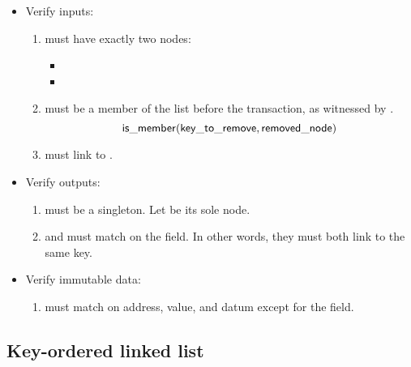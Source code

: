 \documentclass[../midgard.tex]{subfiles}
\begin{document}
\begin{description}
\begin{itemize}
            \item Verify inputs:
            \begin{enumerate}[resume]
                \item {} must have exactly two nodes:
                    \begin{itemize}
                        \item {}
                        \item {}
                    \end{itemize}
                \item {} must be a member of the list before the transaction, as witnessed by .
                    \begin{equation*}
                        \mathsf{is\_member} (\mathsf{key\_to\_remove}, \mathsf{removed\_node})
                    \end{equation*}
                \item {} must link to .
            \end{enumerate}

            \item Verify outputs:
            \begin{enumerate}[resume]
                \item {} must be a singleton. Let  be its sole node.
                \item {} and  must match on the  field. In other words, they must both link to the same key.
            \end{enumerate}
            
            \item Verify immutable data:
            \begin{enumerate}[resume]
                \item {} must match  on address, value, and datum except for the  field.
            \end{enumerate}
        \end{itemize}
\end{description}

\subsection{Key-ordered linked list}
\label{h:key-ordered-list}
\end{document}
